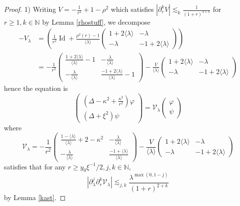 \documentclass[11 pt]{amsart}
\newcommand{\tmop}[1]{\ensuremath{\operatorname{#1}}}
\theoremstyle{definition}
\theoremstyle{remark}
\numberwithin{equation}{section}
\begin{document}
\begin{proof} 1) Writing $V = - \frac{1}{r^2} + 1 - \rho^2$ which satisfies $|
  \partial_r^k V | \lesssim_k \frac{1}{(1 + r)^{4 + k}}$ for $r \geqslant 1, k
  \in \mathbb{N}$ by Lemma \ref{rhostuff}, we decompose
  \begin{align*}
    - V_{\lambda} & = \left( \frac{1}{r^2} \tmop{Id} + \frac{\rho^2 (r) -
    1}{\langle \lambda \rangle} \left(\begin{array}{cc}
      1 + 2 \langle \lambda \rangle & - \lambda\\
      - \lambda & - 1 + 2 \langle \lambda \rangle
    \end{array}\right) \right)\\
    & = - \frac{1}{r^2} \left(\begin{array}{cc}
      \frac{1 + 2 \langle \lambda \rangle}{\langle \lambda \rangle} - 1 & -
      \frac{\lambda}{\langle \lambda \rangle}\\
      - \frac{\lambda}{\langle \lambda \rangle} & \frac{- 1 + 2 \langle
      \lambda \rangle}{\langle \lambda \rangle} - 1
    \end{array}\right) - \frac{V}{\langle \lambda \rangle} \left(\begin{array}{cc}
      1 + 2 \langle \lambda \rangle & - \lambda\\
      - \lambda & - 1 + 2 \langle \lambda \rangle
    \end{array}\right)
  \end{align*}
  hence the equation is
  \[ \left(\begin{array}{c}
       \left( \Delta - \kappa^2 + \frac{\kappa^2}{r^2} \right) \varphi\\
       (\Delta + \xi^2) \psi
     \end{array}\right) =\mathcal{V}_{\lambda} \left(\begin{array}{c}
       \varphi\\
       \psi
     \end{array}\right) \]
  where
  \[ \mathcal{V}_{\lambda} = - \frac{1}{r^2} \left(\begin{array}{cc}
       \frac{1 - \langle \lambda \rangle}{\langle \lambda \rangle} + 2 -
       \kappa^2 & - \frac{\lambda}{\langle \lambda \rangle}\\
       - \frac{\lambda}{\langle \lambda \rangle} & \frac{- 1 + \langle \lambda
       \rangle}{\langle \lambda \rangle}
     \end{array}\right) - \frac{V}{\langle \lambda \rangle}
     \left(\begin{array}{cc}
       1 + 2 \langle \lambda \rangle & - \lambda\\
       - \lambda & - 1 + 2 \langle \lambda \rangle
     \end{array}\right) \]
  satisfies that for any $r \geqslant y_0\xi^{- 1}/2, j, k \in \mathbb{N}$,
  \[ | \partial_{\lambda}^j \partial_r^k \mathcal{V}_{\lambda} | \lesssim_{j,
     k} \frac{\lambda^{\max (0, 1 - j)}}{(1 + r)^{2+k}} \]
  by Lemma \ref{kast}.
  

\end{proof}
\end{document}
